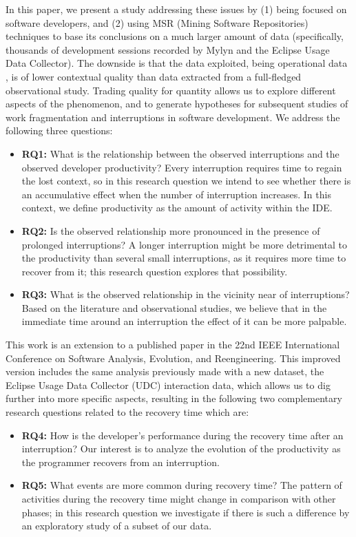\documentclass[times]{smrauth}
\begin{document}
In this paper, we present a study addressing these issues by (1) being focused on software developers, and (2) using MSR (Mining Software Repositories) techniques to base its conclusions on a much larger amount of data (specifically, thousands of development sessions recorded by Mylyn and the Eclipse Usage Data Collector). The downside is that the data exploited, being operational data \cite{M14}, is of lower contextual quality than data extracted from a full-fledged observational study. Trading quality for quantity allows us to explore different aspects of the phenomenon, and to generate hypotheses for subsequent studies of work fragmentation and interruptions in software development. We address the following three questions:
\begin{itemize}
\item \textbf{RQ1:} What is the relationship between the observed interruptions and the observed developer productivity? Every interruption requires time to regain the lost context, so in this research question we intend to see whether there is an accumulative effect when the number of interruption increases. In this context, we define productivity as the amount of activity within the IDE. 
\item \textbf{RQ2:} Is the observed relationship more pronounced in the presence of prolonged interruptions? A longer interruption might be more detrimental to the productivity than several small interruptions, as it requires more time to recover from it; this research question explores that possibility.
\item \textbf{RQ3:}  What is the observed relationship in the vicinity near of interruptions? Based on the literature and observational studies, we believe that in the immediate time around an interruption the effect of it can be more palpable.
\end{itemize}

This work is an extension to a published paper in the 22nd IEEE International Conference on Software Analysis, Evolution, and Reengineering. This improved version includes the same analysis previously made with a new dataset, the Eclipse Usage Data Collector (UDC) interaction data, which allows us to dig further into more specific aspects, resulting in the following two complementary research questions related to the recovery time which are:
\begin{itemize}
\item \textbf{RQ4:} How is the developer's performance during the recovery time after an interruption? Our interest is to analyze the evolution of the productivity as the programmer recovers from an interruption.
\item \textbf{RQ5:} What events are more common during recovery time? The pattern of activities during the recovery time might change in comparison with other phases; in this research question we investigate if there is such a difference by an exploratory study of a subset of our data. 
\end{itemize}
\end{document}
